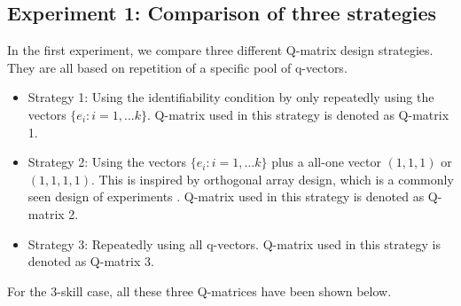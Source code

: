 \documentclass{edm_template}
\begin{document}
\subsection{Experiment 1: Comparison of three strategies}
In the first experiment, we compare three different Q-matrix design strategies. They are all based on repetition of a specific pool of q-vectors.
\begin{itemize}
\item Strategy 1: Using the identifiability condition by only repeatedly using the vectors $\{e_{i}:i=1,...k\}$. Q-matrix used in this strategy is denoted as Q-matrix 1.
\item Strategy 2: Using the vectors $\{e_{i}:i=1,...k\}$ plus a all-one vector $(1,1,1)$ or $(1,1,1,1)$. This is inspired by orthogonal array design, which is a commonly seen design of experiments \cite{montgomery2017design}. Q-matrix used in this strategy is denoted as Q-matrix 2.
\item Strategy 3: Repeatedly using all q-vectors. Q-matrix used in this strategy is denoted as Q-matrix 3.
\end{itemize}
For the 3-skill case, all these three Q-matrices have been shown below. 
\end{document}
